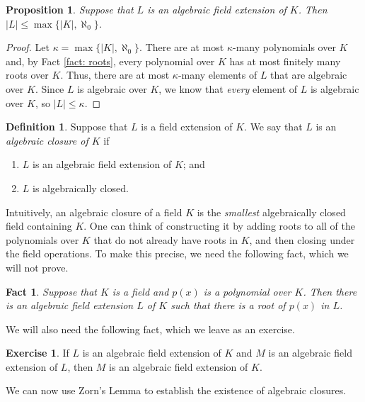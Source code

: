 \documentclass[a4paper]{memoir}
\newtheorem{proposition}[theorem]{Proposition}
\newtheorem{fact}[theorem]{Fact}
\theoremstyle{definition}
\newtheorem{definition}[theorem]{Definition}
\newtheorem{exercise}[theorem]{Exercise}
\begin{document}
\begin{proposition} \label{prop: alg_ext}
  Suppose that $L$ is an algebraic field extension of $K$. Then $|L| \leq \max\{|K|, \aleph_0\}$.
\end{proposition}

\begin{proof}
  Let $\kappa = \max\{|K|, \aleph_0\}$. There are at most $\kappa$-many polynomials over 
  $K$ and, by Fact \ref{fact: roots}, every polynomial over $K$ has at most finitely many 
  roots over $K$. Thus, there are at most $\kappa$-many elements of $L$ that are 
  algebraic over $K$. Since $L$ is algebraic over $K$, we know that \emph{every} element of 
  $L$ is algebraic over $K$, so $|L| \leq \kappa$.
\end{proof}

\begin{definition}
  Suppose that $L$ is a field extension of $K$. We say that $L$ is an \emph{algebraic closure 
  of $K$} if
  \begin{enumerate}
    \item $L$ is an algebraic field extension of $K$; and
    \item $L$ is algebraically closed.
  \end{enumerate}
\end{definition}

Intuitively, an algebraic closure of a field $K$ is the \emph{smallest} algebraically closed 
field containing $K$. One can think of constructing it by adding roots to all of the polynomials 
over $K$ that do not already have roots in $K$, and then closing under the field operations. 
To make this precise, we need the following fact, which we will not prove.

\begin{fact} \label{fact: adding_roots}
  Suppose that $K$ is a field and $p(x)$ is a polynomial over $K$. Then there is an algebraic 
  field extension $L$ of $K$ such that there is a root of $p(x)$ in $L$.
\end{fact}

We will also need the following fact, which we leave as an exercise.

\begin{exercise} \label{exercise: algebraic_transitive}
  If $L$ is an algebraic field extension of $K$ and $M$ is an algebraic field extension of $L$, 
  then $M$ is an algebraic field extension of $K$.
\end{exercise}

We can now use Zorn's Lemma to establish the existence of algebraic closures.
\end{document}
